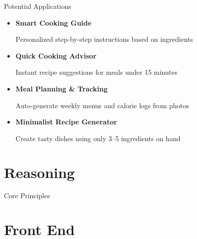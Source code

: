 \documentclass{beamer}
\begin{document}
\begin{frame}{Potential Applications}
  \begin{itemize}
    \item \textbf{Smart Cooking Guide}  
      \begin{itemize}
        \indent Personalized step-by-step instructions based on ingredients
      \end{itemize}
      \vspace{1mm}
    \item \textbf{Quick Cooking Advisor}  
      \begin{itemize}
        \indent Instant recipe suggestions for meals under 15 minutes
      \end{itemize}
            \vspace{1mm}
    \item \textbf{Meal Planning \& Tracking}  
      \begin{itemize}
        \indent Auto-generate weekly menus and calorie logs from photos
      \end{itemize}
            \vspace{1mm}
    \item \textbf{Minimalist Recipe Generator}  
      \begin{itemize}
        \indent Create tasty dishes using only 3–5 ingredients on hand
      \end{itemize}
  \end{itemize}
\end{frame}



\section{Reasoning}
\begin{frame}{Core Principles}
  \begin{center}
  \end{center}
\end{frame}
\section{Front End}
\end{document}
